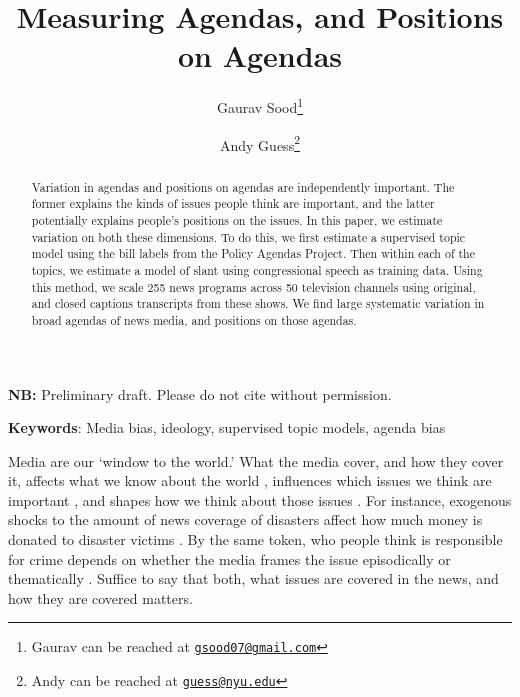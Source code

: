 \documentclass[12pt, letterpaper]{article}
\title{Measuring Agendas, and Positions on Agendas}
\author{Gaurav Sood\thanks{Gaurav can be reached at \href{mailto:gsood07@gmail.com}{\footnotesize{\texttt{gsood07@gmail.com}}}} \and Andy Guess\thanks{Andy can be reached at \href{mailto:guess@nyu.edu}{\texttt{guess@nyu.edu}}}\vspace{.5cm}}
\begin{document}
\maketitle
\thispagestyle{empty}

\begin{center}
\vspace{.5cm}\textbf{NB:} Preliminary draft. Please do not cite without permission.\vspace{1.5cm}
\end{center}

\begin{abstract}
\noindent Variation in agendas and positions on agendas are independently important. The former explains the kinds of issues people think are important, and the latter potentially explains people's positions on the issues. In this paper, we estimate variation on both these dimensions. To do this, we first estimate a supervised topic model using the bill labels from the Policy Agendas Project. Then within each of the topics, we estimate a model of slant using congressional speech as training data. Using this method, we scale 255 news programs across 50 television channels using original, and closed captions transcripts from these shows. We find large systematic variation in broad agendas of news media, and positions on those agendas.  
\end{abstract}

\textbf{Keywords}: Media bias, ideology, supervised topic models, agenda bias

\clearpage
\doublespace
Media are our `window to the world.' What the media cover, and how they cover it, affects what we know about the world \citep{jerit2006citizens}, influences which issues we think are important \citep{mccombs1972agenda, behr1985, iyengar1993news}, and shapes how we think about those issues \citep[for e.g.][]{iyengar1990framing, iyengar1996framing}. For instance, exogenous shocks to the amount of news coverage of disasters affect how much money is donated to disaster victims \citep{eisensee2007news}. By the same token, who people think is responsible for crime depends on whether the media frames the issue episodically or thematically \citep{iyengar1989citizens}. Suffice to say that both, what issues are covered in the news, and how they are covered matters.
\end{document}
